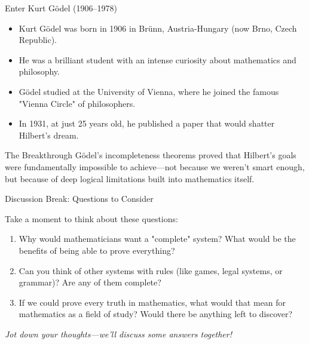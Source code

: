 \documentclass[aspectratio=169]{beamer}
\begin{document}
\begin{frame}{Enter Kurt Gödel (1906--1978)}

\begin{itemize}
    \item Kurt Gödel was born in 1906 in Brünn, Austria-Hungary (now Brno, Czech Republic).
    \item He was a brilliant student with an intense curiosity about mathematics and philosophy.
    \item Gödel studied at the University of Vienna, where he joined the famous "Vienna Circle" of philosophers.
    \item In 1931, at just 25 years old, he published a paper that would shatter Hilbert's dream.
\end{itemize}

\begin{block}{The Breakthrough}
Gödel's incompleteness theorems proved that Hilbert's goals were fundamentally impossible to achieve—not because we weren't smart enough, but because of deep logical limitations built into mathematics itself.
\end{block}

\end{frame}

\begin{frame}{Discussion Break: Questions to Consider}

\begin{block}{Take a moment to think about these questions:}
\begin{enumerate}
    \item Why would mathematicians want a "complete" system? What would be the benefits of being able to prove everything?
    \item Can you think of other systems with rules (like games, legal systems, or grammar)? Are any of them complete?
    \item If we could prove every truth in mathematics, what would that mean for mathematics as a field of study? Would there be anything left to discover?
\end{enumerate}
\end{block}

\vspace{0.5cm}
\begin{center}
\textit{Jot down your thoughts—we'll discuss some answers together!}
\end{center}

\end{frame}
\end{document}
